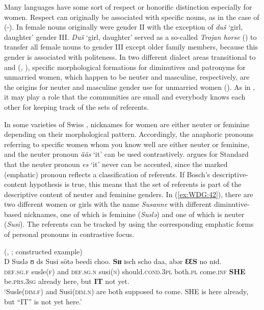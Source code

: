 \documentclass[output=collectionpaper]{langsci/langscibook}
\begin{document}
Many languages have some sort of respect or honorific distinction especially for women. Respect can originally be associated with specific nouns, as in the case of  (-). In  female nouns originally were gender II with the exception of \textit{duš} `girl, daughter' gender III. \textit{Duš} `girl, daughter' served as a so-called \emph{Trojan horse} (\citealt[100]{Corbett1991}) to transfer all female nouns to gender III except older family members, because this gender is associated with politeness. In two different  dialect areas transitional to  and  (, ), specific morphological formations for diminutives and patronyms for unmarried women, which happen to be neuter and masculine, respectively, are the origins for neuter and masculine gender use for unmarried women (\citealt[101]{Corbett1991}). As in , it may play a role that the communities are small and everybody knows each other for keeping track of the sets of referents.

In some varieties of Swiss , nicknames for women are either neuter or feminine depending on their morphological pattern. Accordingly, the anaphoric pronouns referring to specific women whom you know well are either neuter or feminine, and the neuter pronoun \textit{ääs} `it' can be used contrastively. \cite[218]{Bosch1988} argues for Standard  that the neuter pronoun \textit{es} `it' never can be accented, since the marked (emphatic) pronoun reflects a classification of referents. If Bosch's descriptive-content hypothesis is true, this means that the set of referents is part of the descriptive content of  neuter and feminine genders. In (\ref{ex:WDG:42}), there are two different women or girls with the name \textit{Susanne} with different diminutive-based nicknames, one of which is feminine (\textit{Suslǝ}) and one of which is neuter (\textit{Susi}). The referents can be tracked by using the corresponding emphatic forms of personal pronouns in contrastive focus.

\ea\label{ex:WDG:42}
 (, ; constructed example)\\
\gll D	Suslǝ	ʊ	ds	Susi	sötǝ	beedi	choo. \textbf{Sɪɪ}	ɪsch	scho	daa,	abǝr	\textbf{ƐƐS}	no	nɪd.\\
\textsc{def.sg.f}	susle(\textsc{f})	and	\textsc{def.sg.n}	susi(\textsc{n})	should.\textsc{cond.3pl}	both.\textsc{pl}	come.\textsc{inf} \textbf{SHE}	be.\textsc{prs.3sg}	already	here,	but	\textbf{IT}	not	yet.\\
\glt `Susle(\textsc{dim.f}) and Susi(\textsc{dim.n}) are both supposed to come. SHE is here already, but ``IT'' is not yet here.'\\
\z
\end{document}
